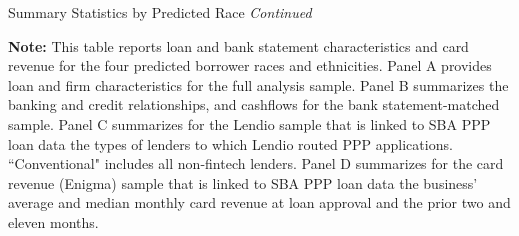\documentclass[11pt]{article}
\begin{document}
\setcounter{table}{2}										%
\newpage
\begin{table}[H]
	\caption{Summary Statistics by Predicted Race \textit{Continued}}
	\begin{adjustbox}{width=\linewidth, center}
		
	\end{adjustbox}

	\begin{adjustbox}{width=\linewidth, center}
		
	\end{adjustbox}
	
	\begin{adjustbox}{width=\linewidth, center}
		
	\end{adjustbox}

	\begin{minipage}{\textwidth} \medskip
		\footnotesize{{\bf Note: }This table reports loan and bank statement characteristics and card revenue for the four predicted borrower races and ethnicities. Panel A provides loan and firm characteristics for the full analysis sample. Panel B summarizes the banking and credit relationships, and cashflows for the bank statement-matched sample. Panel C summarizes for the Lendio sample that is linked to SBA PPP loan data the types of lenders to which Lendio routed PPP applications. ``Conventional" includes all non-fintech lenders. Panel D summarizes for the card revenue (Enigma) sample that is linked to SBA PPP loan data the business' average and median monthly card revenue at loan approval and the prior two and eleven months.}
	\end{minipage}
\end{table}
\end{document}

